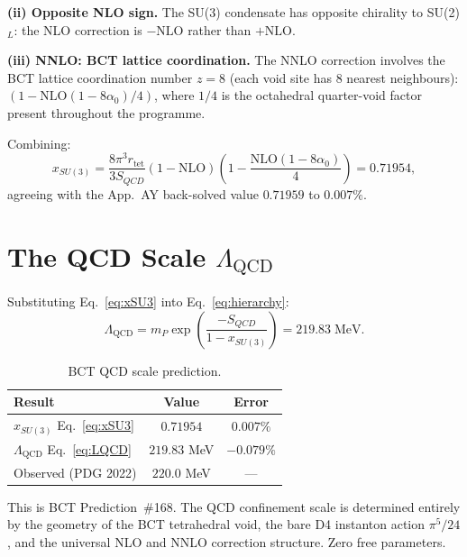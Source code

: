 \documentclass[aps,prl,twocolumn,showpacs,preprintnumbers]{revtex4-2}
\newcommand{\rtet}{r_{\mathrm{tet}}}
\newcommand{\azero}{\alpha_0}
\newcommand{\mP}{m_P}
\newcommand{\LQCD}{\Lambda_{\mathrm{QCD}}}
\newcommand{\NLO}{\mathrm{NLO}}
\begin{document}
\textbf{(ii) Opposite NLO sign.}
The SU(3) condensate has opposite chirality to SU(2)$_L$: the
NLO correction is $-\NLO$ rather than $+\NLO$.

\textbf{(iii) NNLO: BCT lattice coordination.}
The NNLO correction involves the BCT lattice coordination number
$z = 8$ (each void site has 8 nearest neighbours):
$(1-\NLO(1-8\azero)/4)$, where $1/4$ is the
octahedral quarter-void factor present throughout the programme.

Combining:
\begin{equation}
  \boxed{x_{SU(3)} = \frac{8\pi^3\rtet}{3S_{QCD}}
  \left(1-\NLO\right)
  \left(1 - \frac{\NLO(1-8\azero)}{4}\right) = 0.71954,}
  \label{eq:xSU3}
\end{equation}
agreeing with the App.~AY back-solved value $0.71959$ to
$\mathbf{0.007\%}$.

\section{The QCD Scale $\LQCD$}

Substituting Eq.~\eqref{eq:xSU3} into Eq.~\eqref{eq:hierarchy}:
\begin{equation}
  \boxed{
  \LQCD = \mP\exp\!\left(\frac{-S_{QCD}}{1-x_{SU(3)}}\right)
  = 219.83\;\text{MeV}.
  }
  \label{eq:LQCD}
\end{equation}

\begin{table}[h]
\centering
\caption{BCT QCD scale prediction.}
\label{tab:LQCD}
\begin{tabular}{lcc}
\toprule
Result & Value & Error \\
\midrule
$x_{SU(3)}$ Eq.~\eqref{eq:xSU3} & $0.71954$ & $0.007\%$ \\
$\LQCD$ Eq.~\eqref{eq:LQCD}     & $219.83$ MeV & $\mathbf{-0.079\%}$ \\
\midrule
Observed (PDG 2022)               & $220.0$ MeV  & --- \\
\bottomrule
\end{tabular}
\end{table}

This is BCT Prediction~\#168.
The QCD confinement scale is determined entirely by the geometry
of the BCT tetrahedral void, the bare D4 instanton action $\pi^5/24$,
and the universal NLO and NNLO correction structure.
Zero free parameters.
\end{document}
